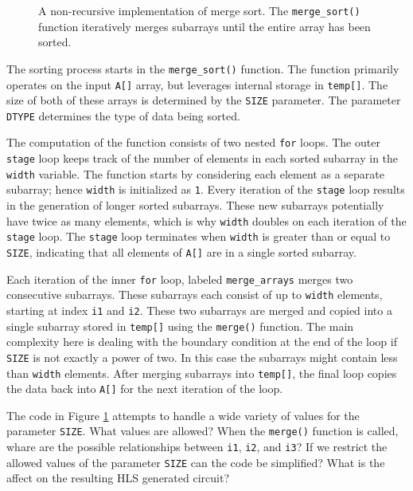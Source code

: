 \begin{figure}

\caption{  A non-recursive implementation of merge sort. The \lstinline{merge_sort()} function iteratively merges subarrays until the entire array has been sorted. }
\label{fig:merge_sort.cpp}
\end{figure}

The sorting process starts in the \lstinline{merge_sort()} function. The function primarily operates on the input \lstinline{A[]} array, but leverages internal storage in \lstinline{temp[]}. The size of both of these arrays is determined by the \lstinline{SIZE} parameter. The parameter \lstinline{DTYPE} determines the type of data being sorted.

The computation of the function consists of two nested \lstinline{for} loops. The outer \lstinline{stage} loop keeps track of the number of elements in each sorted subarray in the \lstinline{width} variable. The function starts by considering each element as a separate subarray; hence \lstinline{width} is initialized as \lstinline{1}. Every iteration of the \lstinline{stage} loop results in the generation of longer sorted subarrays. These new subarrays potentially have twice as many elements, which is why \lstinline{width} doubles on each iteration of the \lstinline{stage} loop. The \lstinline{stage} loop terminates when \lstinline{width} is greater than or equal to \lstinline{SIZE}, indicating that all elements of \lstinline{A[]} are in a single sorted subarray.

Each iteration of the inner \lstinline{for} loop, labeled \lstinline{merge_arrays} merges two consecutive subarrays. These subarrays each consist of up to \lstinline{width} elements, starting at index \lstinline{i1} and \lstinline{i2}.  These two subarrays are merged and copied into a single subarray stored in \lstinline{temp[]} using the \lstinline{merge()} function.  The main complexity here is dealing with the boundary condition at the end of the loop if \lstinline{SIZE} is not exactly a power of two.  In this case the subarrays might contain less than \lstinline{width} elements. After merging subarrays into \lstinline{temp[]}, the final loop copies the data back into \lstinline{A[]} for the next iteration of the loop.

\begin{exercise}
The code in Figure \ref{fig:merge_sort.cpp} attempts to handle a wide variety of values for the parameter \lstinline{SIZE}.  What values are allowed?  When the \lstinline{merge()} function is called, whare are the possible relationships between \lstinline{i1}, \lstinline{i2}, and \lstinline{i3}?   If we restrict the allowed values of the parameter \lstinline{SIZE} can the code be simplified?  What is the affect on the resulting HLS generated circuit? 
\end{exercise}

